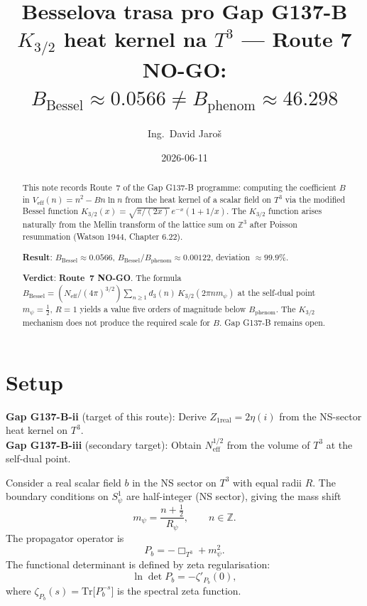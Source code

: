 \documentclass[12pt,a4paper]{article}
\title{\textbf{Besselova trasa pro Gap G137-B}\\[4pt]
  \large $K_{3/2}$ heat kernel na $T^3$ --- Route 7\\[4pt]
  \normalsize \textcolor{red!70!black}{NO-GO: $B_{\mathrm{Bessel}} \approx 0.0566 \neq B_{\mathrm{phenom}} \approx 46.298$}}
\author{Ing.\ David Jaro\v{s}}
\date{2026-06-11}
\theoremstyle{definition}
\theoremstyle{remark}
\begin{document}
\maketitle

\fi

\begin{abstract}
This note records Route~7 of the Gap G137-B programme: computing the
coefficient $B$ in $V_{\mathrm{eff}}(n) = n^2 - Bn\ln n$ from the heat
kernel of a scalar field on $T^3$ via the modified Bessel function
$K_{3/2}(x) = \sqrt{\pi/(2x)}\,e^{-x}(1 + 1/x)$.  The $K_{3/2}$ function
arises naturally from the Mellin transform of the lattice sum on $\mathbb{Z}^3$
after Poisson resummation (Watson 1944, Chapter 6.22).

\textbf{Result}: $B_{\mathrm{Bessel}} \approx 0.0566$,\quad
$B_{\mathrm{Bessel}}/B_{\mathrm{phenom}} \approx 0.00122$,\quad
deviation $\approx 99.9\%$.

\textbf{Verdict}: \textbf{Route~7 NO-GO}.  The formula
$B_{\mathrm{Bessel}} = (N_{\mathrm{eff}}/(4\pi)^{3/2})\sum_{n\geq1}
d_3(n)\,K_{3/2}(2\pi n m_\psi)$ at the self-dual point
$m_\psi = \tfrac12,\, R=1$ yields a value five orders of magnitude below
$B_{\mathrm{phenom}}$.  The $K_{3/2}$ mechanism does not produce the required
scale for $B$.  Gap G137-B remains open.
\end{abstract}

\tableofcontents

\section{Setup}
\label{sec:setup}

\begin{gapbox}
\textbf{Gap G137-B-ii} (target of this route): Derive $Z_{1\mathrm{real}} = 2\eta(i)$
from the NS-sector heat kernel on $T^3$.\\
\textbf{Gap G137-B-iii} (secondary target): Obtain $N_{\mathrm{eff}}^{1/2}$
from the volume of $T^3$ at the self-dual point.
\end{gapbox}

Consider a real scalar field $b$ in the NS sector on $T^3$ with equal radii $R$.
The boundary conditions on $S^1_\psi$ are half-integer (NS sector), giving the
mass shift
\begin{equation}
  m_\psi = \frac{n + \tfrac12}{R_\psi}, \qquad n \in \mathbb{Z}.
  \label{eq:mpsi}
\end{equation}
The propagator operator is
\[
  P_b = -\Box_{T^3} + m_\psi^2.
\]
The functional determinant is defined by zeta regularisation:
\begin{equation}
  \ln\det P_b = -\zeta'_{P_b}(0),
  \label{eq:zetareg}
\end{equation}
where $\zeta_{P_b}(s) = \mathrm{Tr}\bigl[P_b^{-s}\bigr]$ is the spectral zeta
function.
\end{document}
